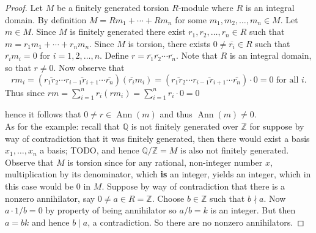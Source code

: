 \documentclass[8pt]{amsart}
\theoremstyle{plain}%
\theoremstyle{definition}
\theoremstyle{remark}
\numberwithin{equation}{section}
\newcommand{\Z}{\mathbb{Z}}
\newcommand{\Q}{\mathbb{Q}}
\newcommand{\D}{\displaystyle}
\begin{document}
	\begin{proof}
		Let $M$ be a finitely generated torsion $R$-module where $R$ is an integral domain. By definition $M = Rm_1 + \cdots + Rm_n$ for some $m_1, m_2, \ldots, m_n \in M$. Let $m \in M$. Since $M$ is finitely generated there exist $r_1, r_2, \ldots, r_n \in R$ such that $m = r_1m_1 + \cdots + r_nm_n$. Since $M$ is torsion, there exists $0 \neq \overline{r_i} \in R$ such that $\overline{r_i}m_i = 0$ for $i = 1, 2, \ldots, n$. Define $r = \overline{r_1} \overline{r_2} \cdots \overline{r_n}$. Note that $R$ is an integral domain, so that $r \neq 0$. Now observe that {\color{red} $$rm_i = (\overline{r_1r_2} \cdots \overline{r_{i - 1}r_{i + 1}} \cdots \overline{r_n})(\overline{r_i}m_i) =  (\overline{r_1r_2} \cdots \overline{r_{i - 1}r_{i + 1}} \cdots \overline{r_n}) \cdot 0 = 0 \text{ for all } i.$$ Thus since $rm = \D \sum_{i = 1}^n r_i(rm_i) = \sum_{i = 1}^n r_i \cdot 0 = 0$}

		hence it follows that $0 \neq r \in \operatorname{Ann}(m)$ and thus $\operatorname{Ann}(m) \neq 0$.\\

		As for the example: recall that $\Q$ is not finitely generated {\color{red} over $\Z$ for suppose by way of contradiction that it was finitely generated, then there would exist a basis $x_1, \ldots, x_n$ a basis; TODO}, and hence $\Q/\Z = M$ is also not finitely generated. Observe that $M$ is torsion since for any rational, non-integer number $x$, multiplication by its denominator, which \textbf{is} an integer, yields an integer, which in this case would be 0 in $M$. Suppose by way of contradiction that there is a nonzero annihilator, say $0 \neq a \in R = \Z$. Choose $b \in \Z$ such that $b \nmid a$. Now $a \cdot 1/b = 0$ by property of being annihilator so $a/b = k$ is an integer. But then $a = bk$ and hence $b \mid a$, a contradiction. So there are no nonzero annihilators.
	\end{proof}
\end{document}
